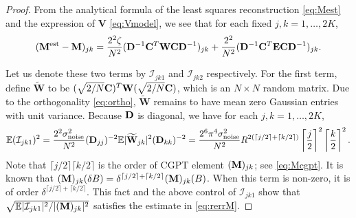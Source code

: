 \begin{proof}
From the analytical formula of the least squares reconstruction
\eqref{eq:Mest} and the expression of $\mathbf{V}$
\eqref{eq:Vmodel}, we see that
for each fixed $j,k = 1, \ldots, 2K$,
\begin{equation*}
(\mathbf{M}^{\mathrm{est}} - \mathbf{M})_{jk} =  \frac{2^2
\zeta}{N^2} (\mathbf{D}^{-1} \mathbf{C}^T \mathbf{W}
\mathbf{C} \mathbf{D}^{-1})_{jk} + \frac{2^2}{N^2}(\mathbf{D}^{-1} \mathbf{C}^T
\mathbf{E} \mathbf{C} \mathbf{D}^{-1})_{jk}.
\end{equation*}

Let us denote these two terms by $\mathcal{I}_{jk1}$ and
$\mathcal{I}_{jk2}$ respectively. For the first term, define
$\widetilde{\mathbf{W}}$ to be $(\sqrt{2/N}\mathbf{C})^T \mathbf{W}
(\sqrt{2/N}\mathbf{C})$, which is an $N \times N$ random matrix. Due
to the orthogonality \eqref{eq:ortho}, $\widetilde{\mathbf{W}}$
remains to have mean zero Gaussian entries with unit variance.
Because $\mathbf{D}$ is diagonal, we have for each $j,k = 1, \ldots,
2K$,
\begin{equation*}
\mathbb{E} (\mathcal{I}_{jk1})^2 =
\frac{2^2\sigma^2_{\mathrm{noise}}}{N^2} (\mathbf{D}_{jj})^{-2} \mathbb{E}
|\widetilde{\mathbf{W}}_{jk}|^2 (\mathbf{D}_{kk})^{-2} =
\frac{2^6\pi^4 \sigma^2_{\mathrm{noise}}}{N^2} R^{2(\lceil j/2
\rceil + \lceil k/2 \rceil)} \left\lceil \frac{j}{2} \right
\rceil^2 \left\lceil \frac{k}{2} \right\rceil^2.
\end{equation*}
Note that $\lceil j/2 \rceil \lceil k/2 \rceil$ is the order of
CGPT element $(\mathbf{M})_{jk}$; see \eqref{eq:Mcgpt}. It is known
that $(\mathbf{M})_{jk}(\delta B) = \delta^{\lceil j/2 \rceil + \lceil
k/2 \rceil} (\mathbf{M})_{jk}(B)$. When this term is non-zero, it is
of order $\delta^{\lceil j/2 \rceil + \lceil k/2 \rceil}$. This
fact and the above control of $\mathcal{I}_{jk1}$ show that
$\sqrt{\mathbb{E} |\mathcal{I}_{jk1}|^2/|(\mathbf{M})_{jk}|^2}$ satisfies the
estimate in \eqref{eq:rerrM}.


\end{proof}
